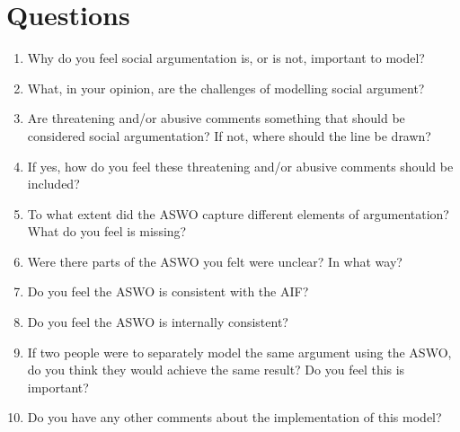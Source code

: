 \section{Questions}
\begin{enumerate}

\item Why do you feel social argumentation is, or is not, important to model?

\item What, in your opinion, are the challenges of modelling social argument?



\item Are threatening and/or abusive comments something that should be considered social argumentation? If not, where should the line be drawn?

\item If yes, how do you feel these threatening and/or abusive comments should be included?


\item To what extent did the ASWO capture different elements of argumentation? What do you feel is missing?

\item Were there parts of the ASWO you felt were unclear? In what way?


\item Do you feel the ASWO is consistent with the AIF?

\item Do you feel the ASWO is internally consistent?

\item If two people were to separately model the same argument using the ASWO, do you think they would achieve the same result? Do you feel this is important?

\item Do you have any other comments about the implementation of this model?
\end{enumerate}